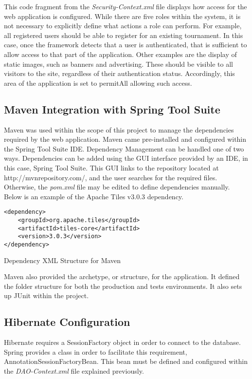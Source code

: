 This code fragment from the \textit{Security-Context.xml} file displays how access for the web application is configured. While there are five roles within the system, it is not necessary to explicitly define what actions a role can perform. For example, all registered users should be able to register for an existing tournament. In this case, once the framework detects that a user is authenticated, that is sufficient to allow access to that part of the application. Other examples are the display of static images, such as banners and advertising. These should be visible to all visitors to the site, regardless of their authentication status. Accordingly, this area of the application is set to permitAll allowing such access.

\subsection{Maven Integration with Spring Tool Suite}

Maven was used within the scope of this project to manage the dependencies required by the web application. Maven came pre-installed and configured within the Spring Tool Suite IDE. Dependency Management can be handled one of two ways. Dependencies can be added using the GUI interface provided by an IDE, in this case, Spring Tool Suite. This GUI links to the repository located at http://mvnrepository.com/, and the user searches for the required files. Otherwise, the \textit{pom.xml} file may be edited to define dependencies manually. Below is an example of the Apache Tiles v3.0.3 dependency.

\begin{table}[H]
\begin{lstlisting}
<dependency>
	<groupId>org.apache.tiles</groupId>
	<artifactId>tiles-core</artifactId>
	<version>3.0.3</version>
</dependency>
\end{lstlisting}
\caption{Dependency XML Structure for Maven}
\end{table}

Maven also provided the archetype, or structure, for the application. It defined the folder structure for both the production and tests environments. It also sets up JUnit within the project.

\subsection{Hibernate Configuration}

Hibernate requires a SessionFactory object in order to connect to the database. Spring provides a class in order to facilitate this requirement, AnnotationSessionFactoryBean. This bean must be defined and configured within the \textit{DAO-Context.xml} file explained previously. 

